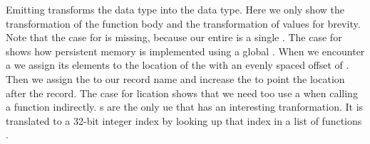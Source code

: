 Emitting transforms the  data type into the  data type. Here we only show the transformation of the function body  and the transformation of values for brevity. Note that the case for  is missing, because our entire  is a single . The case for  shows how persistent memory is implemented using a global . When we encounter a  we assign its elements  to the location of the  with an evenly spaced offset of . Then we assign the  to our record name and increase the  to point the location after the record. The case for lication shows that we need too use a  when calling a function indirectly. s are the only ue that has an interesting tranformation. It is translated to a 32-bit integer index by looking up that index in a list of functions .